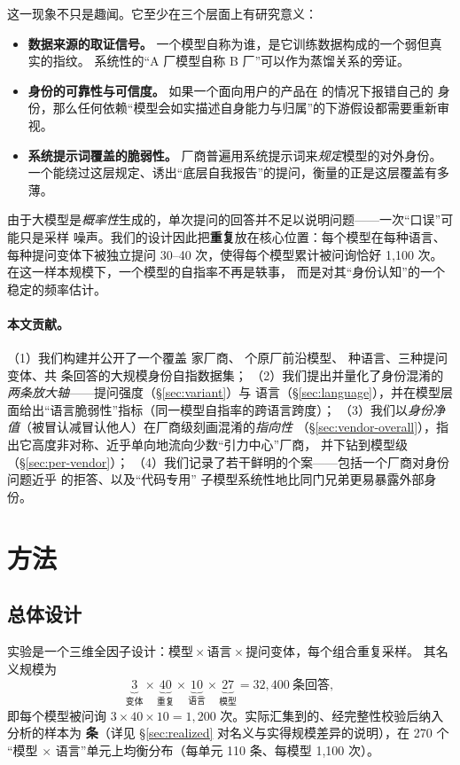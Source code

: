 \documentclass[11pt,fontset=fandol]{ctexart}
\begin{document}
这一现象不只是趣闻。它至少在三个层面上有研究意义：
\begin{itemize}
  \item \textbf{数据来源的取证信号。} 一个模型自称为谁，是它训练数据构成的一个弱但真实的指纹。
  系统性的``A 厂模型自称 B 厂''可以作为蒸馏关系的旁证。
  \item \textbf{身份的可靠性与可信度。} 如果一个面向用户的产品在  的情况下报错自己的
  身份，那么任何依赖``模型会如实描述自身能力与归属''的下游假设都需要重新审视。
  \item \textbf{系统提示词覆盖的脆弱性。} 厂商普遍用系统提示词来\emph{规定}模型的对外身份。
  一个能绕过这层规定、诱出``底层自我报告''的提问，衡量的正是这层覆盖有多薄。
\end{itemize}

由于大模型是\emph{概率性}生成的，单次提问的回答并不足以说明问题——一次``口误''可能只是采样
噪声。我们的设计因此把\textbf{重复}放在核心位置：每个模型在每种语言、每种提问变体下被独立提问
30--40 次，使得每个模型累计被问询恰好 1{,}100 次。在这一样本规模下，一个模型的自指率不再是轶事，
而是对其``身份认知''的一个稳定的频率估计。

\paragraph{本文贡献。}
（1）我们构建并公开了一个覆盖 \statVendors{} 家厂商、\statModels{} 个原厂前沿模型、\statLangs{}
种语言、三种提问变体、共 \statTotal{} 条回答的大规模身份自指数据集；
（2）我们提出并量化了身份混淆的\emph{两条放大轴}——提问强度（\S\ref{sec:variant}）与
语言（\S\ref{sec:language}），并在模型层面给出``语言脆弱性''指标（同一模型自指率的跨语言跨度）；
（3）我们以\emph{身份净值}（被冒认减冒认他人）在厂商级刻画混淆的\emph{指向性}
（\S\ref{sec:vendor-overall}），指出它高度非对称、近乎单向地流向少数``引力中心''厂商，
并下钻到模型级（\S\ref{sec:per-vendor}）；
（4）我们记录了若干鲜明的个案——包括一个厂商对身份问题近乎  的拒答、以及``代码专用''
子模型系统性地比同门兄弟更易暴露外部身份。

\section{方法}\label{sec:method}

\subsection{总体设计}\label{sec:design}
实验是一个三维全因子设计：$\text{模型} \times \text{语言} \times \text{提问变体}$，每个组合重复采样。
其名义规模为
\[
\underbrace{3}_{\text{变体}} \times \underbrace{40}_{\text{重复}} \times \underbrace{10}_{\text{语言}}
\times \underbrace{27}_{\text{模型}} = 32{,}400 \ \text{条回答},
\]
即每个模型被问询 $3\times 40\times 10 = 1{,}200$ 次。实际汇集到的、经完整性校验后纳入分析的样本为
\textbf{\statTotal{} 条}（详见 \S\ref{sec:realized} 对名义与实得规模差异的说明），在 270 个
``模型 $\times$ 语言''单元上均衡分布（每单元 110 条、每模型 1{,}100 次）。
\end{document}
